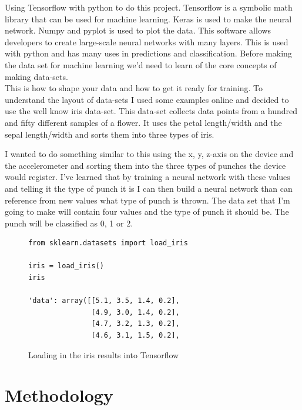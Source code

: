\documentclass[a4paper,12pt]{report}
\begin{document}
Using Tensorflow with python to do this project. Tensorflow is a symbolic math library that can be used for machine learning. Keras is used to make the neural network. Numpy and pyplot is used to plot the data. This software allows developers to create large-scale neural networks with many layers. This is used with python and has many uses in predictions and classification. Before making the data set for machine learning we'd need to learn of the core concepts of making data-sets.\\This is how to shape your data and how to get it ready for training. To understand the layout of data-sets I used some examples online and decided to use the well know iris data-set. This data-set collects data points from a hundred and fifty different samples of a flower. It uses the petal length/width and the sepal length/width and sorts them into three types of iris.

I wanted to do something similar to this using the x,  y,  z-axis on the device and the accelerometer and sorting them into the three types of punches the device would register. I've learned that by training a neural network with these values and telling it the type of punch it is I can then build a neural network than can reference from new values what type of punch is thrown. The data set that I'm going to make will contain four values and the type of punch it should be. The punch will be classified as 0, 1 or 2.
\newline
\begin{figure}[h]
\begin{verbatim}
from sklearn.datasets import load_iris

iris = load_iris()
iris

'data': array([[5.1, 3.5, 1.4, 0.2],
               [4.9, 3.0, 1.4, 0.2],
               [4.7, 3.2, 1.3, 0.2],
               [4.6, 3.1, 1.5, 0.2],
\end{verbatim}
\caption{Loading in the iris results into Tensorflow}
\label{fig:iris}
\end{figure}

\chapter{Methodology}
\end{document}
